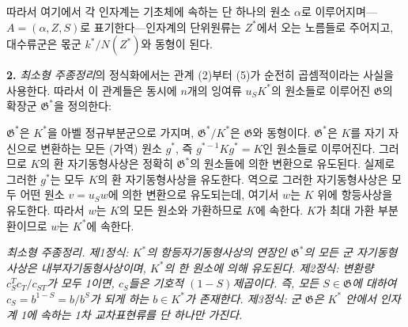 
따라서 여기에서 각 인자계는 기초체에 속하는 단 하나의 원소 \(\alpha\)로 이루어지며---\(A=(\alpha,Z,S)\)로 표기한다---인자계의 단위원류는 \(Z^*\)에서 오는 노름들로 주어지고, 대수류군은 몫군 \(k^*/N(Z^*)\)와 동형이 된다.

\noindent\textbf{2.} \emph{최소형 주종정리}의 정식화에서는 관계 (2)부터 (5)가 순전히 곱셈적이라는 사실을 사용한다. 따라서 이 관계들은 동시에 \(n\)개의 잉여류 \(u_SK^*\)의 원소들로 이루어진 \(\mathfrak G\)의 확장군 \(\mathfrak G^*\)을 정의한다:


\(\mathfrak G^*\)은 \(K^*\)을 아벨 정규부분군으로 가지며, \(\mathfrak G^*/K^*\)은 \(\mathfrak G\)와 동형이다. \(\mathfrak G^*\)은 \(K\)를 자기 자신으로 변환하는 모든 (가역) 원소 \(g^*\), 즉 \(g^{*-1}Kg^*=K\)인 원소들로 이루어진다. 그러므로 \(K\)의 환 자기동형사상은 정확히 \(\mathfrak G^*\)의 원소들에 의한 변환으로 유도된다. 실제로 그러한 \(g^*\)는 모두 \(K\)의 환 자기동형사상을 유도한다. 역으로 그러한 자기동형사상은 모두 어떤 원소 \(v=u_Sw\)에 의한 변환으로 유도되는데, 여기서 \(w\)는 \(K\) 위에 항등사상을 유도한다. 따라서 \(w\)는 \(K\)의 모든 원소와 가환하므로 \(K\)에 속한다. \(K\)가 최대 가환 부분환이므로 \(w\)는 \(K^*\)에 속한다.

\emph{최소형 주종정리. 제1정식: \(K^*\)의 항등자기동형사상의 연장인 \(\mathfrak G^*\)의 모든 군 자기동형사상은 내부자기동형사상이며, \(K^*\)의 한 원소에 의해 유도된다. 제2정식: 변환량 \(c_S^Tc_T/c_{ST}\)가 모두 1이면, \(c_S\)들은 기호적 \((1-S)\)제곱이다. 즉, 모든 \(S\in\mathfrak G\)에 대하여 \(c_S=b^{1-S}=b/b^S\)가 되게 하는 \(b\in K^*\)가 존재한다. 제3정식: 군 \(\mathfrak G\)은 \(K^*\) 안에서 인자계 1에 속하는 1차 교차표현류를 단 하나만 가진다.}

